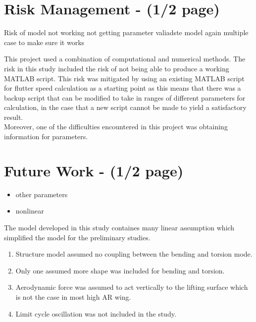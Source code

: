 \documentclass[11pt]{article}
\begin{document}
\section{Risk Management - (1/2 page)}
\label{sec:risk}
Risk of model not working
not getting parameter
valiadste model again multiple case to make sure it works

This project used a combination of computational and numerical methods. The risk in this study included the risk of not being able to produce a working MATLAB script. This risk was mitigated by using an existing MATLAB script \cite{Wright2015INTRODUCTIONLOADS} for flutter speed calculation as a starting point as this means that there was a backup script that can be modified to take in ranges of different parameters for calculation, in the case that a new script cannot be made to yield a satisfactory result.\\

Moreover, one of the difficulties encountered in this project was obtaining information for parameters.

\section{Future Work - (1/2 page)}
\label{sec:future-work}
\begin{itemize}
    \item other parameters
    \item nonlinear
\end{itemize}
The model developed in this study containes many linear assumption which simplified the model for the preliminary studies.
\begin{enumerate}
    \item Structure model assumed no coupling between the bending and torsion mode.
    \item Only one assumed more shape was included for bending and torsion.
    \item Aerodynamic force was assumed to act vertically to the lifting surface which is not the case in most high AR wing.
    \item Limit cycle oscillation was not included in the study.
\end{enumerate}

\end{document}
